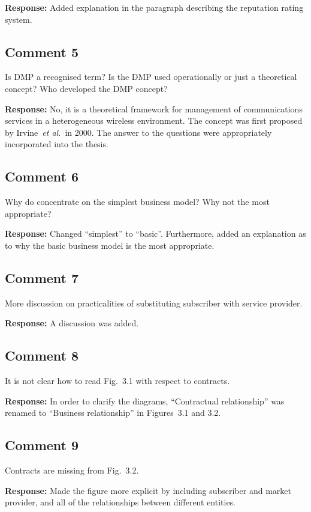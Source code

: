 \documentclass[10pt,a4paper,notitlepage]{article}
\numberwithin{equation}{section}
\begin{document}
\textbf{Response:}
Added explanation in the paragraph describing the reputation rating system.

\subsection{Comment 5}
Is DMP a recognised term? Is the DMP used operationally or just a theoretical concept? Who developed the DMP concept?

\textbf{Response:}
No, it is a theoretical framework for management of communications services in a heterogeneous wireless environment. The concept was first proposed by Irvine~\emph{et al.}~in 2000. The answer to the questions were appropriately incorporated into the thesis.

\subsection{Comment 6}
Why do concentrate on the simplest business model? Why not the most appropriate?

\textbf{Response:}
Changed ``simplest'' to ``basic''. Furthermore, added an explanation as to why the basic business model is the most appropriate.

\subsection{Comment 7}
More discussion on practicalities of substituting subscriber with service provider.

\textbf{Response:}
A discussion was added.

\subsection{Comment 8}
It is not clear how to read Fig.~3.1 with respect to contracts.

\textbf{Response:}
In order to clarify the diagrams, ``Contractual relationship'' was renamed to ``Business relationship'' in Figures~3.1 and 3.2.

\subsection{Comment 9}
Contracts are missing from Fig.~3.2.

\textbf{Response:}
Made the figure more explicit by including subscriber and market provider, and all of the relationships between different entities.
\end{document}
